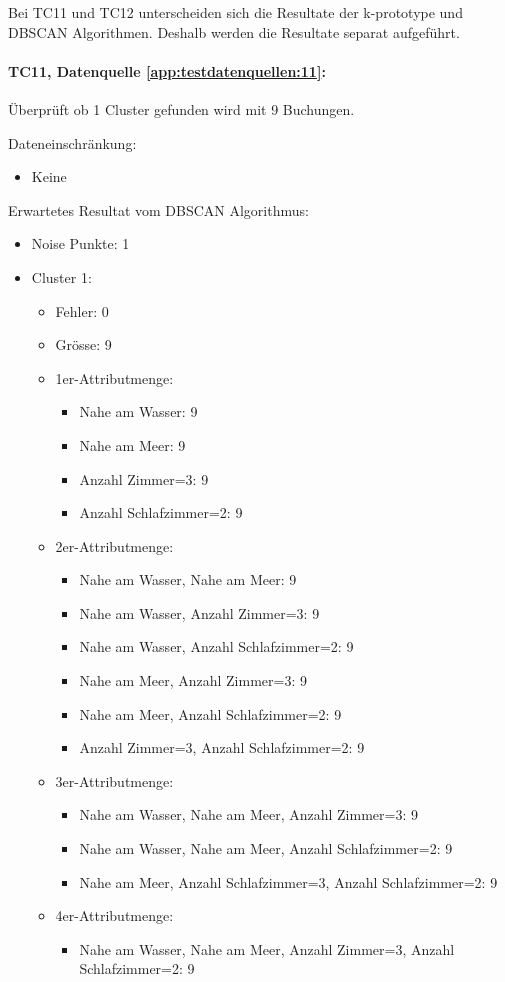 Bei TC11 und TC12 unterscheiden sich die Resultate der k-prototype und DBSCAN Algorithmen. Deshalb werden die Resultate separat aufgeführt.

\paragraph{TC11, Datenquelle \cref{app:testdatenquellen:11}:} Überprüft ob 1 Cluster gefunden wird mit 9 Buchungen. 

Dateneinschränkung:
\begin{itemize}
	\item Keine
\end{itemize}

Erwartetes Resultat vom DBSCAN Algorithmus:
\begin{itemize}
	\item Noise Punkte: 1
	\item Cluster 1:
	\begin{itemize}
		\item Fehler: 0
		\item Grösse: 9
			\item 1er-Attributmenge:
			\begin{itemize}
				\item Nahe am Wasser: 9
				\item Nahe am Meer: 9
				\item Anzahl Zimmer=3: 9
				\item Anzahl Schlafzimmer=2: 9
			\end{itemize}
			\item 2er-Attributmenge:
			\begin{itemize}
				\item Nahe am Wasser, Nahe am Meer: 9
				\item Nahe am Wasser, Anzahl Zimmer=3: 9
				\item Nahe am Wasser, Anzahl Schlafzimmer=2: 9
			
				\item Nahe am Meer, Anzahl Zimmer=3: 9
				\item Nahe am Meer, Anzahl Schlafzimmer=2: 9
			
				\item Anzahl Zimmer=3, Anzahl Schlafzimmer=2: 9
			\end{itemize}
			\item 3er-Attributmenge:
			\begin{itemize}
				\item Nahe am Wasser, Nahe am Meer, Anzahl Zimmer=3: 9
				\item Nahe am Wasser, Nahe am Meer, Anzahl Schlafzimmer=2: 9
				\item Nahe am Meer, Anzahl Schlafzimmer=3, Anzahl Schlafzimmer=2: 9
			\end{itemize}
			\item 4er-Attributmenge:
			\begin{itemize}
				\item Nahe am Wasser, Nahe am Meer, Anzahl Zimmer=3, Anzahl Schlafzimmer=2: 9
			\end{itemize}
	\end{itemize}
\end{itemize}

